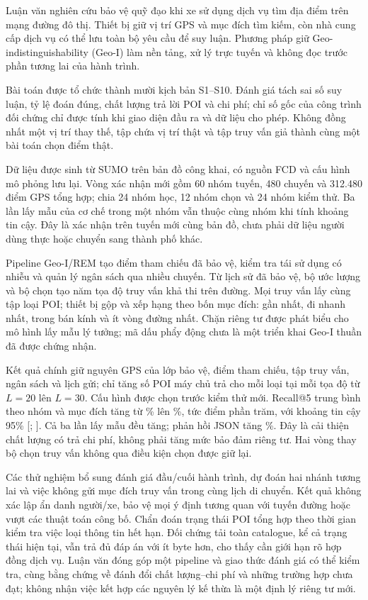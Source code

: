 \documentclass[12pt,a4paper,oneside]{report}
\begin{document}
Luận văn nghiên cứu bảo vệ quỹ đạo khi xe sử dụng dịch vụ tìm địa điểm trên mạng đường đô thị. Thiết bị giữ vị trí GPS và mục đích tìm kiếm, còn nhà cung cấp dịch vụ có thể lưu toàn bộ yêu cầu để suy luận. Phương pháp giữ Geo-indistinguishability (Geo-I) làm nền tảng, xử lý trực tuyến và không đọc trước phần tương lai của hành trình.

Bài toán được tổ chức thành mười kịch bản S1--S10. Đánh giá tách sai số suy luận, tỷ lệ đoán đúng, chất lượng trả lời POI và chi phí; chỉ số gốc của công trình đối chứng chỉ được tính khi giao diện đầu ra và dữ liệu cho phép. Không đồng nhất một vị trí thay thế, tập chứa vị trí thật và tập truy vấn giả thành cùng một bài toán chọn điểm thật.

Dữ liệu được sinh từ SUMO trên bản đồ công khai, có nguồn FCD và cấu hình mô phỏng lưu lại. Vòng xác nhận mới gồm 60 nhóm tuyến, 480 chuyến và 312.480 điểm GPS tổng hợp; chia 24 nhóm học, 12 nhóm chọn và 24 nhóm kiểm thử. Ba lần lấy mẫu của cơ chế trong một nhóm vẫn thuộc cùng nhóm khi tính khoảng tin cậy. Đây là xác nhận trên tuyến mới cùng bản đồ, chưa phải dữ liệu người dùng thực hoặc chuyển sang thành phố khác.

Pipeline Geo-I/REM tạo điểm tham chiếu đã bảo vệ, kiểm tra tái sử dụng có nhiễu và quản lý ngân sách qua nhiều chuyến. Từ lịch sử đã bảo vệ, bộ ước lượng và bộ chọn tạo năm tọa độ truy vấn khả thi trên đường. Mọi truy vấn lấy cùng tập loại POI; thiết bị gộp và xếp hạng theo bốn mục đích: gần nhất, đi nhanh nhất, trong bán kính và ít vòng đường nhất. Chặn riêng tư được phát biểu cho mô hình lấy mẫu lý tưởng; mã dấu phẩy động chưa là một triển khai Geo-I thuần đã được chứng nhận.

Kết quả chính giữ nguyên GPS của lớp bảo vệ, điểm tham chiếu, tập truy vấn, ngân sách và lịch gửi; chỉ tăng số POI máy chủ trả cho mỗi loại tại mỗi tọa độ từ $L=20$ lên $L=30$. Cấu hình được chọn trước kiểm thử mới. Recall@5 trung bình theo nhóm và mục đích tăng từ \EvalFreshRecallBefore{}\% lên \EvalFreshRecallAfter{}\%, tức \EvalFreshGain{} điểm phần trăm, với khoảng tin cậy 95\% [\EvalFreshLow{}; \EvalFreshHigh{}]. Cả ba lần lấy mẫu đều tăng; phản hồi JSON tăng \EvalReplyGrowth{}\%. Đây là cải thiện chất lượng có trả chi phí, không phải tăng mức bảo đảm riêng tư. Hai vòng thay bộ chọn truy vấn không qua điều kiện chọn được giữ lại.

Các thử nghiệm bổ sung đánh giá đầu/cuối hành trình, dự đoán hai nhánh tương lai và việc không gửi mục đích truy vấn trong cùng lịch di chuyển. Kết quả không xác lập ẩn danh người/xe, bảo vệ mọi ý định tương quan với tuyến đường hoặc vượt các thuật toán công bố. Chẩn đoán trạng thái POI tổng hợp theo thời gian kiểm tra việc loại thông tin hết hạn. Đối chứng tải toàn catalogue, kể cả trạng thái hiện tại, vẫn trả đủ đáp án với ít byte hơn, cho thấy cần giới hạn rõ hợp đồng dịch vụ. Luận văn đóng góp một pipeline và giao thức đánh giá có thể kiểm tra, cùng bằng chứng về đánh đổi chất lượng--chi phí và những trường hợp chưa đạt; không nhận việc kết hợp các nguyên lý kế thừa là một định lý riêng tư mới.
\end{document}
